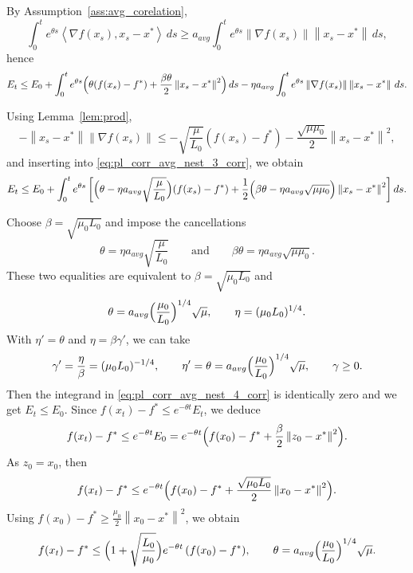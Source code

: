 \documentclass{article}
\newcommand{\norm}[1]{\left\lVert#1\right\rVert}
\newcommand{\dotprod}[1]{\left< #1\right>}
\theoremstyle{plain}
\theoremstyle{definition}
\theoremstyle{remark}
\begin{document}
By Assumption~\ref{ass:avg_corelation},
\[
\int_0^t e^{\theta s}\dotprod{\nabla f(x_s),x_s-x^\ast}\,ds
\ge a_{avg}\int_0^t e^{\theta s}\norm{\nabla f(x_s)}\norm{x_s-x^\ast}\,ds,
\]
hence
\begin{equation}\label{eq:pl_corr_avg_nest_3_corr}
E_t
\le E_0 + \int_0^t e^{\theta s}\Bigl(
 \theta(f(x_s)-f^\ast)
 +\frac{\beta\theta}{2}\norm{x_s-x^\ast}^2
 \Bigr)\,ds
 - \eta a_{avg}\int_0^t e^{\theta s}\norm{\nabla f(x_s)}\norm{x_s-x^\ast}\,ds.
\end{equation}

Using Lemma~\ref{lem:prod},
\[
-\norm{x_s-x^\ast}\norm{\nabla f(x_s)}
\le -\sqrt{\frac{\mu}{L_0}}(f(x_s)-f^\ast)
 -\frac{\sqrt{\mu\mu_0}}{2}\norm{x_s-x^\ast}^2,
\]
and inserting into \eqref{eq:pl_corr_avg_nest_3_corr}, we obtain
\begin{equation}\label{eq:pl_corr_avg_nest_4_corr}
E_t
\le E_0 + \int_0^t e^{\theta s}\left[
\Bigl(\theta-\eta a_{avg}\sqrt{\frac{\mu}{L_0}}\Bigr)(f(x_s)-f^\ast)
+\frac{1}{2}\Bigl(\beta\theta-\eta a_{avg}\sqrt{\mu\mu_0}\Bigr)\norm{x_s-x^\ast}^2
\right]ds.
\end{equation}

Choose $\beta=\sqrt{\mu_0L_0}$ and impose the cancellations
\[
\theta=\eta a_{avg}\sqrt{\frac{\mu}{L_0}}
\qquad\text{and}\qquad
\beta\theta=\eta a_{avg}\sqrt{\mu\mu_0}.
\]
These two equalities are equivalent to $\beta=\sqrt{\mu_0L_0}$ and
\[
\theta=a_{avg}\Bigl(\frac{\mu_0}{L_0}\Bigr)^{1/4}\sqrt{\mu},
\qquad
\eta=(\mu_0L_0)^{1/4}.
\]
With $\eta'=\theta$ and $\eta=\beta\gamma'$, we can take
\[
\gamma'=\frac{\eta}{\beta}=(\mu_0L_0)^{-1/4},
\qquad
\eta'=\theta=a_{avg}\Bigl(\frac{\mu_0}{L_0}\Bigr)^{1/4}\sqrt{\mu},
\qquad
\gamma\ge 0.
\]
Then the integrand in \eqref{eq:pl_corr_avg_nest_4_corr} is identically zero and we get $E_t\le E_0$.
Since $f(x_t)-f^\ast \le e^{-\theta t}E_t$, we deduce
\[
f(x_t)-f^\ast \le e^{-\theta t}E_0
= e^{-\theta t}\Bigl(f(x_0)-f^\ast+\frac{\beta}{2}\norm{z_0-x^\ast}^2\Bigr).
\]
As $z_0=x_0$, then
\[
f(x_t)-f^\ast \le e^{-\theta t}\Bigl(f(x_0)-f^\ast+\frac{\sqrt{\mu_0L_0}}{2}\norm{x_0-x^\ast}^2\Bigr).
\]
Using $f(x_0)-f^\ast \ge \frac{\mu_0}{2}\norm{x_0-x^\ast}^2$, we obtain
\[
f(x_t)-f^\ast
\le \Bigl(1+\sqrt{\frac{L_0}{\mu_0}}\Bigr)e^{-\theta t}\,(f(x_0)-f^\ast),
\qquad
\theta=a_{avg}\Bigl(\frac{\mu_0}{L_0}\Bigr)^{1/4}\sqrt{\mu}.
\]
\end{document}
